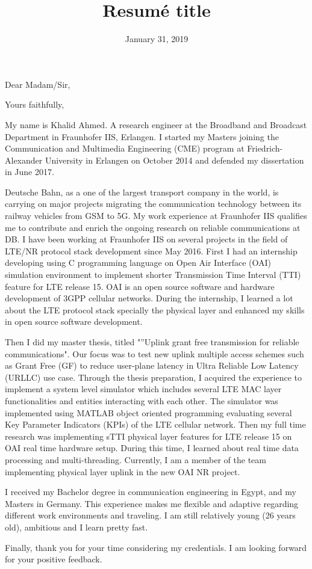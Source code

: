 \documentclass[11pt,a4paper,sans]{moderncv}        %
\title{Resumé title}                               %
\begin{document}

\date{January 31, 2019}
\opening{Dear Madam/Sir,}
\closing{Yours faithfully,}
\makelettertitle

My name is Khalid Ahmed. A research engineer at the Broadband and Broadcast Department in Fraunhofer IIS, Erlangen. I started my Masters joining the Communication and Multimedia Engineering (CME) program at Friedrich-Alexander University in Erlangen on October 2014 and defended my dissertation in June 2017.

Deutsche Bahn, as a one of the largest transport company in the world, is carrying on major projects migrating the communication technology between its railway vehicles from GSM to 5G. My work experience at Fraunhofer IIS qualifies me to contribute and enrich the ongoing research on reliable communications at DB. I have been working at Fraunhofer IIS on several projects in the field of LTE/NR protocol stack development since May 2016. First I had an internship developing using C programming language on Open Air Interface (OAI) simulation environment to implement shorter Transmission Time Interval (TTI) feature for LTE release 15. OAI is an open source software and hardware development of 3GPP cellular networks. During the internship, I learned a lot about the LTE protocol stack specially the physical layer and enhanced my skills in open source software development. 

Then I did my master thesis, titled "”Uplink grant free transmission for reliable communications". Our focus was to test new uplink multiple access schemes such as Grant Free (GF) to reduce user-plane latency in Ultra Reliable Low Latency (URLLC) use case. Through the thesis preparation, I acquired the experience to implement a system level simulator which includes several LTE MAC layer functionalities and entities interacting with each other. The simulator was implemented using MATLAB object oriented programming evaluating several Key Parameter Indicators (KPIs) of the LTE cellular network. Then my full time research was implementing sTTI physical layer features for LTE release 15 on OAI real time hardware setup. During this time, I learned about real time data processing and multi-threading. Currently, I am a member of the team implementing physical layer uplink in the new OAI NR project.  

I received my Bachelor degree in communication engineering in Egypt, and my Masters in Germany. This experience makes me flexible and adaptive regarding different work environments and traveling. I am still relatively young (26 years old), ambitious and I learn pretty fast. 

Finally, thank you for your time considering my credentials. 
I am looking forward for your positive feedback.

\makeletterclosing
\end{document}
